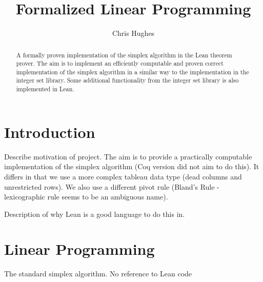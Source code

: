 \documentclass[11pt]{article} %
\title{Formalized Linear Programming}
\author{Chris Hughes}
\date{}
\begin{document}

\lstset{language=lean}
\lstset{basicstyle=\normalsize}
\maketitle
\begin{abstract}
  A formally proven implementation of the simplex algorithm in the Lean theorem prover. The aim is to implement an efficiently computable and proven correct implementation of the simplex algorithm in a similar way to the implementation in the integer set library. Some additional functionality from the integer set library is also implemented in Lean.
\end{abstract}

\section{Introduction}
\color{red}Describe motivation of project.
The aim is to provide a practically computable implementation of the simplex algorithm (Coq version did not aim to do this). It differs in that we use a more complex tableau data type (dead columns and unrestricted rows). We also use a different pivot rule (Bland's Rule - lexicographic rule seems to be an ambiguous name).

Description of why Lean is a good language to do this in.\color{black}

\section{Linear Programming}
\color{red} The standard simplex algorithm. No reference to Lean code \color{black}
\end{document}
